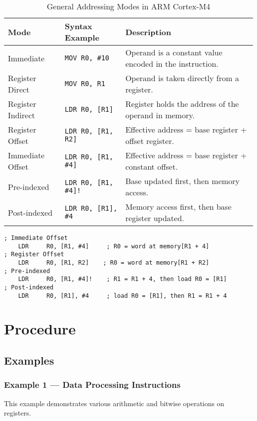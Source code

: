 \begin{table}[H]
\centering
\caption{General Addressing Modes in ARM Cortex-M4}
\small
\begin{tabularx}{\linewidth}{@{}l l X@{}}
\toprule
\textbf{Mode} & \textbf{Syntax Example} & \textbf{Description} \\
\midrule
Immediate      & \texttt{MOV R0, \#10}          & Operand is a constant value encoded in the instruction. \\
Register Direct& \texttt{MOV R0, R1}            & Operand is taken directly from a register. \\
Register Indirect & \texttt{LDR R0, [R1]}       & Register holds the address of the operand in memory. \\
Register Offset & \texttt{LDR R0, [R1, R2]}     & Effective address = base register + offset register. \\
Immediate Offset & \texttt{LDR R0, [R1, \#4]}   & Effective address = base register + constant offset. \\
Pre-indexed    & \texttt{LDR R0, [R1, \#4]!}    & Base updated first, then memory access. \\
Post-indexed   & \texttt{LDR R0, [R1], \#4}     & Memory access first, then base register updated. \\
\bottomrule
\end{tabularx}
\vspace{2pt}
\end{table}
\begin{lstlisting}[caption={Examples of Offset, Pre-indexed, and Post-indexed Addressing Modes}]
; Immediate Offset
    LDR     R0, [R1, #4]     ; R0 = word at memory[R1 + 4]
; Register Offset
    LDR     R0, [R1, R2]    ; R0 = word at memory[R1 + R2]
; Pre-indexed
    LDR     R0, [R1, #4]!    ; R1 = R1 + 4, then load R0 = [R1]
; Post-indexed
    LDR     R0, [R1], #4     ; load R0 = [R1], then R1 = R1 + 4
\end{lstlisting}

\newpage
\section{Procedure}

\subsection{Examples}

\subsubsection{Example 1 --- Data Processing Instructions}
This example demonstrates various arithmetic and bitwise operations on registers.

\newpage
